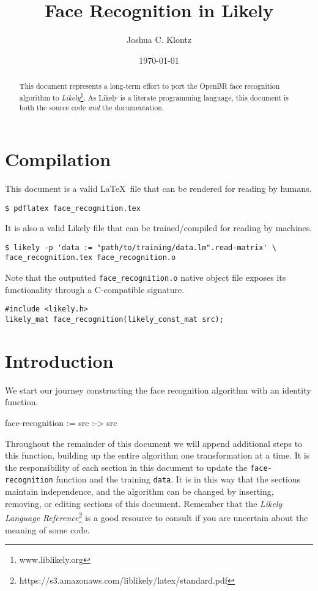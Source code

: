 \documentclass{article}
\title{Face Recognition in Likely}
\author{Joshua C. Klontz}
\date{\today}
\begin{document}
\maketitle

\begin{abstract}
This document represents a long-term effort to port the OpenBR face recognition algorithm to \emph{Likely}\footnote{www.liblikely.org}.
As Likely is a literate programming language, this document is both the source code \emph{and} the documentation.
\end{abstract}

\section{Compilation}
\label{sec:compilation}
This document is a valid \LaTeX\ file that can be rendered for reading by humans.

\begin{verbatim}
$ pdflatex face_recognition.tex
\end{verbatim}

It is also a valid Likely file that can be trained/compiled for reading by machines.

\begin{verbatim}
$ likely -p 'data := "path/to/training/data.lm".read-matrix' \
face_recognition.tex face_recognition.o
\end{verbatim}

Note that the outputted \texttt{face\_recognition.o} native object file exposes its functionality through a C-compatible signature.

\begin{verbatim}
#include <likely.h>
likely_mat face_recognition(likely_const_mat src);
\end{verbatim}

\section{Introduction}
We start our journey constructing the face recognition algorithm with an identity function.

\begin{likely}
face-recognition :=
  src :->
    src
\end{likely}

Throughout the remainder of this document we will append additional steps to this function, building up the entire algorithm one transformation at a time.
It is the responsibility of each section in this document to update the \texttt{face-recognition} function and the training \texttt{data}.
It is in this way that the sections maintain independence, and the algorithm can be changed by inserting, removing, or editing sections of this document.
Remember that the \emph{Likely Language Reference}\footnote{https://s3.amazonaws.com/liblikely/latex/standard.pdf} is a good resource to consult if you are uncertain about the meaning of some code.
\end{document}
